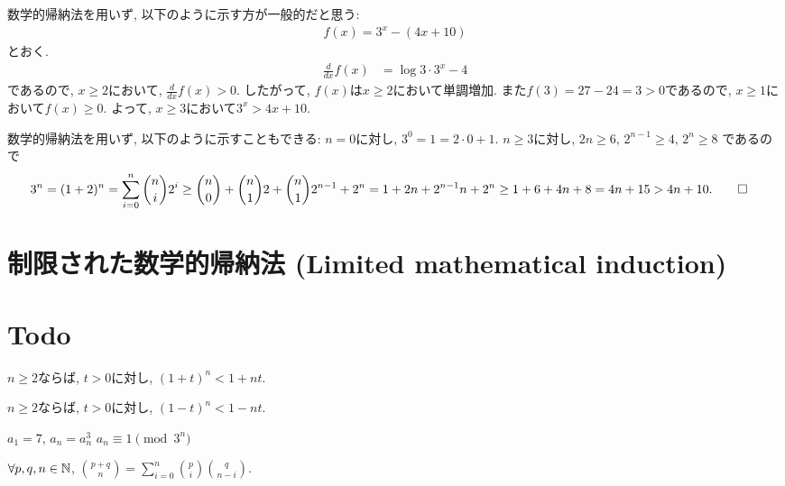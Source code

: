 \begin{rem}
  数学的帰納法を用いず, 以下のように示す方が一般的だと思う:
  \begin{align*}
    f(x)=3^x-(4x+10)
  \end{align*}
  とおく.
  \begin{align*}
    \frac{d}{dx}f(x)&=\log 3 \cdot 3^x-4
  \end{align*}
  であるので,
  $x\geq 2$において,
  $\frac{d}{dx}f(x)> 0$.
  したがって, $f(x)$は$x\geq 2$において単調増加.
  また$f(3)=27-24=3>0$であるので,
  $x\geq 1$において$f(x) \geq 0$.
  よって, $x\geq 3$において$3^x > 4x+10$.
\end{rem}
\begin{rem}
  数学的帰納法を用いず, 以下のように示すこともできる:
  $n=0$に対し, $3^0=1=2\cdot0+1$.
  $n\geq 3$に対し, $2n\geq 6$, $2^{n-1}\geq 4$, $2^n\geq 8$
  であるので
  \begin{align*}
    3^n=(1+2)^n=\sum_{i=0}^n \binom{n}{i}2^i
    &\geq \binom{n}{0}+\binom{n}{1}2+\binom{n}{1}2^{n-1}+2^{n}
    =1+2n+2^{n-1}n+2^n
    \geq 1+6+4n+8=4n+15>4n+10
    .\qedhere
  \end{align*}
\end{rem}


\section{制限された数学的帰納法 (Limited mathematical induction)}

\section{Todo}




\begin{prop}
  $n\geq 2$ならば,  $t>0$に対し,
$(1+t)^n<1+nt$.
\end{prop}

\begin{prop}
  $n\geq 2$ならば,  $t>0$に対し,
$(1-t)^n<1-nt$.
\end{prop}

\begin{prop}
  $a_1=7$, $a_{n}=a_{n}^3$
  $a_n\equiv 1\pmod{3^n}$
\end{prop}


\begin{prop}
  $\forall p,q,n\in\mathbb{N}$,
  $\binom{p+q}{n}=\sum_{i=0}^n\binom{p}{i}\binom{q}{n-i}$.
\end{prop}



